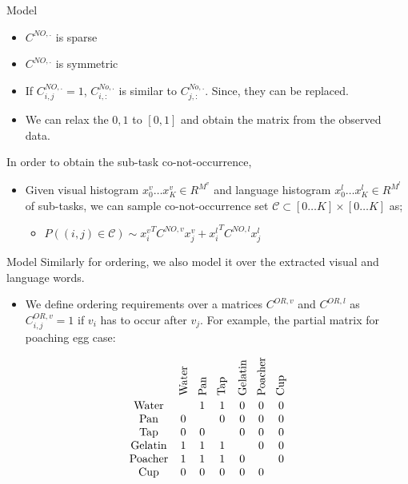 \begin{frame}{Model}
\begin{itemize}
\item $C^{NO,.}$ is sparse
\item $C^{NO,.}$ is symmetric
\item If $C^{NO,.}_{i,j}=1$, $C^{No,.}_{i,:}$ is similar to  $C^{No,.}_{j,:}$. Since, they can be replaced.
\item We can relax the ${0,1}$ to $[0,1]$ and obtain the matrix from the observed data.
\end{itemize}
In order to obtain the sub-task co-not-occurrence,
\begin{itemize}
\item Given visual histogram $x^v_0 \ldots x^v_K \in R^{M^v}$ and language histogram $x^l_0 \ldots x^l_K \in R^{M^l}$ of sub-tasks, we can sample co-not-occurrence set $\mathcal{C} \subset [0\ldots K]
 \times [0 \ldots K]$ as;
\begin{itemize}
\item $P((i,j) \in \mathcal{C}) \sim {x^v_i}^T C^{NO,v} x^v_j + {x^l_i}^T C^{NO,l} x^l_j$
\end{itemize}
\end{itemize}
\end{frame}


\begin{frame}{Model}
Similarly for ordering, we also model it over the extracted visual and language words.
\begin{itemize}
\item We define ordering requirements over a matrices $C^{OR,v}$ and $C^{OR,l}$ as $C^{OR,v}_{i,j} =1$ if $v_i$ has to occur after $v_j$. For example, the partial matrix for poaching egg case:
\end{itemize}
\[
 \begin{array}{ccccccc}
&\rotatebox{90}{Water} & \rotatebox{90}{Pan} & \rotatebox{90}{Tap} & \rotatebox{90}{Gelatin} & \rotatebox{90}{Poacher} & \rotatebox{90}{Cup} \\
\text{Water} &  & 1 & 1 & 0 & 0 & 0 \\
\text{Pan} & 0 &  & 0 & 0 & 0 & 0 \\
\text{Tap} & 0 & 0 &  & 0 & 0 & 0 \\
\text{Gelatin} & 1 & 1 & 1 &  & 0 & 0 \\
\text{Poacher} & 1 & 1 & 1 & 0 &  & 0 \\
\text{Cup} & 0 & 0 & 0 & 0 & 0 &
\end{array}
\]
\end{frame}

